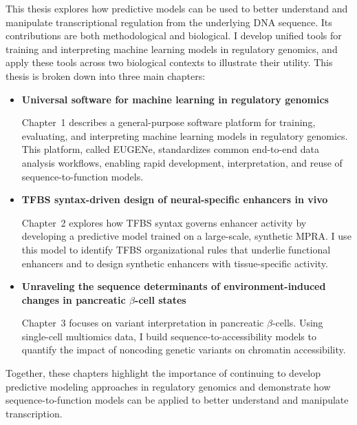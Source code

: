 \begin{dissertationintroduction}
This thesis explores how predictive models can be used to better understand and manipulate transcriptional regulation from the underlying DNA sequence. Its contributions are both methodological and biological. I develop unified tools for training and interpreting machine learning models in regulatory genomics, and apply these tools across two biological contexts to illustrate their utility. This thesis is broken down into three main chapters:

\begin{itemize}
  \item \textbf{Universal software for machine learning in regulatory genomics}

  Chapter~1 describes a general-purpose software platform for training, evaluating, and interpreting machine learning models in regulatory genomics. This platform, called EUGENe, standardizes common end-to-end data analysis workflows, enabling rapid development, interpretation, and reuse of sequence-to-function models.

  \item \textbf{TFBS syntax-driven design of neural-specific enhancers in vivo}

  Chapter~2 explores how TFBS syntax governs enhancer activity by developing a predictive model trained on a large-scale, synthetic MPRA. I use this model to identify TFBS organizational rules that underlie functional enhancers and to design synthetic enhancers with tissue-specific activity.

  \item \textbf{Unraveling the sequence determinants of environment-induced changes in pancreatic $\beta$-cell states}

  Chapter~3 focuses on variant interpretation in pancreatic $\beta$-cells. Using single-cell multiomics data, I build sequence-to-accessibility models to quantify the impact of noncoding genetic variants on chromatin accessibility.
\end{itemize}

Together, these chapters highlight the importance of continuing to develop predictive modeling approaches in regulatory genomics and demonstrate how sequence-to-function models can be applied to better understand and manipulate transcription.


\end{dissertationintroduction}
